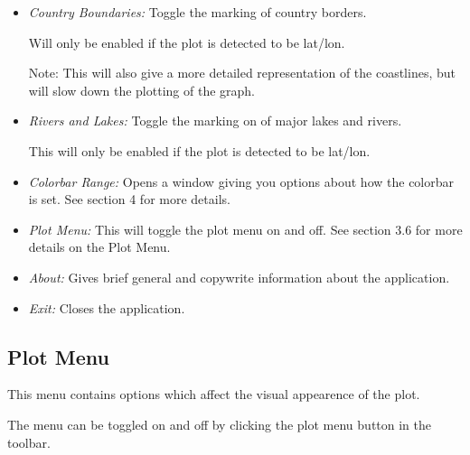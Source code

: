 \documentclass[a4paper,12pt]{article}
\begin{document}
\begin{itemize}
\item
\emph{Country Boundaries:} Toggle the marking of country borders.

Will only be enabled if the plot is detected to be lat/lon.

Note: This will also give a more detailed representation of the coastlines,
but will slow down the plotting of the graph.

\item
\emph{Rivers and Lakes:} Toggle the marking on of major lakes and rivers.

This will only be enabled if the plot is detected to be lat/lon.

\item
\emph{Colorbar Range:} Opens a window giving you options about how the colorbar
is set. See section 4 for more details.

\item
\emph{Plot Menu:} This will toggle the plot menu on and off. See section 3.6
for more details on the Plot Menu.

\item
\emph{About:} Gives brief general and copywrite information about the
application.

\item
\emph{Exit:} Closes the application.

\end{itemize}


\subsection{Plot Menu}

This menu contains options which affect the visual appearence of the plot.

The menu can be toggled on and off by clicking the plot menu button in the
toolbar.
\end{document}
